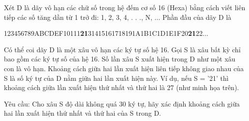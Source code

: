 Xét D là dãy vô hạn các chữ số trong hệ đếm cơ số 16 (Hexa) bằng cách viết liên tiếp các số tăng dần từ 1 trở đi: 1, 2, 3, 4, . . ., N, ... Phần đầu của dãy D là

123456789ABCDEF10111\textbf{21}31415161718191A1B1C1D1E1F20\textbf{21}22...

Có thể coi dãy D là một xâu vô hạn các ký tự số hệ 16. Gọi S là xâu bất kỳ chỉ bao gồm các ký tự số của hệ 16. Số lần xâu S xuất hiện trong D như một xâu con là vô hạn. Khoảng cách giữa hai lần xuất hiện liên tiếp không giao nhau của S là số ký tự của D nằm giữa hai lần xuất hiện này. Ví dụ, nếu S = ’21’ thì khoảng cách giữa lần xuất hiện thứ nhất và thứ hai là 27 (như minh họa trên).

Yêu cầu: Cho xâu S độ dài không quá 30 ký tự, hãy xác định khoảng cách giữa hai lần xuất hiện thứ nhất và thứ hai của S trong D.